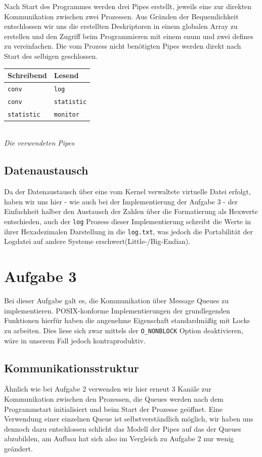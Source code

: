 \documentclass[12pt, a4paper]{scrartcl}
\begin{document}
Nach Start des Programmes werden drei Pipes erstellt, jeweils eine zur direkten
Kommunikation zwischen zwei Prozessen. Aus Gründen der Bequemlichkeit entschlossen 
wir uns die erstellten Deskriptoren in einem globalen Array zu erstellen und den
Zugriff beim Programmieren mit einem enum und zwei defines zu vereinfachen. Die
vom Prozess nicht benötigten Pipes werden direkt nach Start des selbigen geschlossen.\\

\begin{center}
\begin{tabular}{|l|l|}
\hline
	\textbf{Schreibend} & \textbf{Lesend} \\
\hline
	\texttt{conv} & \texttt{log} \\
\hline
	\texttt{conv} & \texttt{statistic} \\
\hline
	\texttt{statistic} & \texttt{monitor}\\
\hline
\end{tabular}\\
\textit{Die verwendeten Pipes}
\end{center}

\subsection{Datenaustausch}
Da der Datenaustausch über eine vom Kernel verwaltete virtuelle Datei erfolgt,
haben wir uns hier - wie auch bei der Implementierung der Aufgabe 3 - der
Einfachheit halber den Austausch der Zahlen über die Formatierung als Hexwerte
entschieden, auch der \texttt{log} Prozess dieser Implementierung schreibt die
Werte in ihrer Hexadezimalen Darstellung in die \texttt{log.txt}, was jedoch die
Portabilität der Logdatei auf andere Systeme erschwert(Little-/Big-Endian).

\clearpage
\section{Aufgabe 3}

Bei dieser Aufgabe galt es, die Kommunikation über Message Queues zu implementieren.
POSIX-konforme Implementierungen der grundlegenden Funktionen hierfür haben die
angenehme Eigenschaft standardmäßig mit Locks zu arbeiten. Dies liese sich zwar
mittels der \texttt{O\_NONBLOCK} Option deaktivieren, wäre in unserem Fall
jedoch kontraproduktiv.

\subsection{Kommunikationsstruktur}
Ähnlich wie bei Aufgabe 2 verwenden wir hier erneut 3 Kanäle zur Kommunikation
zwischen den Prozessen, die Queues werden nach dem Programmstart initialisiert
und beim Start der Prozesse geöffnet. Eine Verwendung einer einzelnen Queue ist
selbstverständlich möglich, wir haben uns dennoch dazu entschlossen schlicht das
Modell der Pipes auf das der Queues abzubilden, am Aufbau hat sich also im Vergleich
zu Aufgabe 2 nur wenig geändert.
\np
\end{document}
